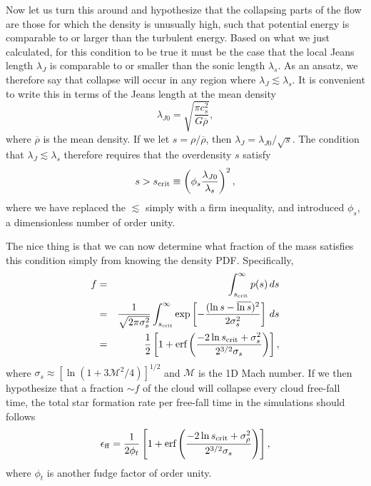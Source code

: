 Now let us turn this around and hypothesize that the collapsing parts of the flow are those for which the density is unusually high, such that potential energy is comparable to or larger than the turbulent energy. Based on what we just calculated, for this condition to be true it must be the case that the local Jeans length $\lambda_J$ is comparable to or smaller than the sonic length $\lambda_s$. As an ansatz, we therefore say that collapse will occur in any region where $\lambda_J \lesssim \lambda_s$. It is convenient to write this in terms of the Jeans length at the mean density
\begin{equation}
\lambda_{J0}=\sqrt{\frac{\pi c_s^2}{G\overline{\rho}}},
\end{equation}
where $\overline{\rho}$ is the mean density. If we let $s = \rho/\overline{\rho}$, then $\lambda_J = \lambda_{J0}/\sqrt{s}$. The condition that $\lambda_J \lesssim \lambda_s$ therefore requires that the overdensity $s$ satisfy
\begin{equation}
s > s_{\rm crit} \equiv \left(\phi_s \frac{\lambda_{J0}}{\lambda_s}\right)^2,
\end{equation}
where we have replaced the $\lesssim$ simply with a firm inequality, and introduced $\phi_s$, a dimensionless number of order unity.

The nice thing is that we can now determine what fraction of the mass satisfies this condition simply from knowing the density PDF. Specifically,
\begin{eqnarray}
f & = & \int_{s_{\rm crit}}^\infty p(s) \,ds \\
& = & \frac{1}{\sqrt{2\pi \sigma_s^2}}
\int_{s_{\rm crit}}^\infty \exp\left[-\frac{(\ln s - \overline{\ln s})^2}{2\sigma_s^2}\right] \, ds \\
& = & \frac{1}{2} \left[1+\mbox{erf}\left(\frac{-2\ln s_{\rm crit}+\sigma_s^2}{2^{3/2}\sigma_s}\right)\right],
\end{eqnarray}
where $\sigma_s \approx [\ln(1+3\mathcal{M}^2/4)]^{1/2}$ and $\mathcal{M}$ is the 1D Mach number. If we then hypothesize that a fraction $\sim f$ of the cloud will collapse every cloud free-fall time, the total star formation rate per free-fall time in the simulations should follows
\begin{equation}
\epsilon_{\rm ff} = \frac{1}{2 \phi_t} \left[1+\mbox{erf}\left(\frac{-2\ln s_{\rm crit}+\sigma_{\rho}^2}{2^{3/2}\sigma_s}\right)\right],
\end{equation}
where $\phi_t$ is another fudge factor of order unity.

